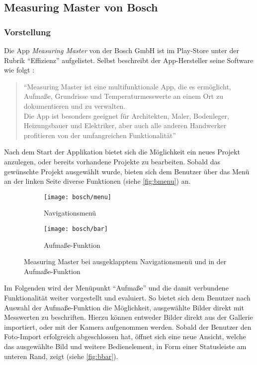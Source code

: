 \subsection{Measuring Master von Bosch}

\subsubsection{Vorstellung}
Die App \emph{Measuring Master} von der Bosch GmbH ist im Play-Store unter der Rubrik ``Effizienz'' aufgelistet.
Selbst beschreibt der App-Hersteller seine Software wie folgt \citep{BoschMM}:

\begin{quote}
  ``Measuring Master ist eine multifunktionale App, die es ermöglicht, Aufmaße, Grundrisse und Temperaturmesswerte an einem Ort zu dokumentieren und zu verwalten.\\
  Die App ist besonders geeignet für Architekten, Maler, Bodenleger, Heizungsbauer und Elektriker, aber auch alle anderen Handwerker profitieren von der umfangreichen Funktionalität''
\end{quote}

\noindent
Nach dem Start der Applikation bietet sich die Möglichkeit ein neues Projekt anzulegen, oder bereits vorhandene Projekte zu bearbeiten.
Sobald das gewünschte Projekt ausgewählt wurde, bieten sich dem Benutzer über das Menü an der linken Seite diverse Funktionen (siehe \autoref{fig:bmenu}) an. \\

\begin{figure}[h]
  \centering
	\begin{subfigure}[b]{0.4\textwidth}
		\texttt{[image: bosch/menu]}
		\caption{Navigationsmenü}
		\label{fig:bmenu}	
	\end{subfigure}
	\begin{subfigure}[b]{0.4\textwidth}
		\texttt{[image: bosch/bar]}
		\caption{Aufmaße-Funktion}
		\label{fig:bbar}	
	\end{subfigure}
  \caption{Measuring Master bei ausgeklapptem Navigationsmenü und in der Aufmaße-Funktion}
\end{figure}

Im Folgenden wird der Menüpunkt ``Aufmaße'' und die damit verbundene Funktionalität weiter vorgestellt und evaluiert.
So bietet sich dem Benutzer nach Auswahl der Aufmaße-Funktion die Möglichkeit, ausgewählte Bilder direkt mit Messwerten zu beschriften.
Hierzu können entweder Bilder direkt aus der Gallerie importiert, oder mit der Kamera aufgenommen werden.
Sobald der Benutzer den Foto-Import erfolgreich abgeschlossen hat, öffnet sich eine neue Ansicht, welche das ausgewählte Bild und weitere Bedienelement, in Form einer Statusleiste am unteren Rand, zeigt (siehe \autoref{fig:bbar}). \\


